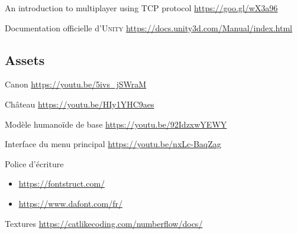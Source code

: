 \documentclass[12pt]{report}
\begin{document}
An introduction to multiplayer using TCP protocol
\url{https://goo.gl/wX3a96}

Documentation officielle d'\textsc{Unity}
\url{https://docs.unity3d.com/Manual/index.html}

\subsection*{Assets}

Canon
\url{https://youtu.be/5ivs_jSWraM}

Château
\url{https://youtu.be/HIy1YHC9aes}

Modèle humanoïde de base
\url{https://youtu.be/92IdzxwYEWY}

Interface du menu principal
\url{https://youtu.be/nxLc-BaqZag}

Police d’écriture
\begin{itemize}
    \item \url{https://fontstruct.com/}
    \item \url{https://www.dafont.com/fr/}
\end{itemize}

Textures \url{https://catlikecoding.com/numberflow/docs/}
\end{document}
